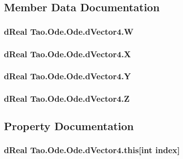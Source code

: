 \subsection{Member Data Documentation}
\hypertarget{struct_tao_1_1_ode_1_1_ode_1_1d_vector4_a473e7cd9bea8d218b3974ab6435f60e7}{
\subsubsection[{W}]{\setlength{\rightskip}{0pt plus 5cm}dReal {\bf Tao.Ode.Ode.dVector4.W}}}
\label{struct_tao_1_1_ode_1_1_ode_1_1d_vector4_a473e7cd9bea8d218b3974ab6435f60e7}
\hypertarget{struct_tao_1_1_ode_1_1_ode_1_1d_vector4_aaf49131f71e1646a0daead1f177e31e3}{
\subsubsection[{X}]{\setlength{\rightskip}{0pt plus 5cm}dReal {\bf Tao.Ode.Ode.dVector4.X}}}
\label{struct_tao_1_1_ode_1_1_ode_1_1d_vector4_aaf49131f71e1646a0daead1f177e31e3}
\hypertarget{struct_tao_1_1_ode_1_1_ode_1_1d_vector4_acb788d66c1d18be2e7d912729c9ebfd9}{
\subsubsection[{Y}]{\setlength{\rightskip}{0pt plus 5cm}dReal {\bf Tao.Ode.Ode.dVector4.Y}}}
\label{struct_tao_1_1_ode_1_1_ode_1_1d_vector4_acb788d66c1d18be2e7d912729c9ebfd9}
\hypertarget{struct_tao_1_1_ode_1_1_ode_1_1d_vector4_af591a8cc6be6f3b2d15a304e99285b12}{
\subsubsection[{Z}]{\setlength{\rightskip}{0pt plus 5cm}dReal {\bf Tao.Ode.Ode.dVector4.Z}}}
\label{struct_tao_1_1_ode_1_1_ode_1_1d_vector4_af591a8cc6be6f3b2d15a304e99285b12}


\subsection{Property Documentation}
\hypertarget{struct_tao_1_1_ode_1_1_ode_1_1d_vector4_a7d9b55ac2b24b6f5c23738cd8dc85a7d}{
\subsubsection[{this}]{\setlength{\rightskip}{0pt plus 5cm}dReal Tao.Ode.Ode.dVector4.this\mbox{[}int index\mbox{]}}}
\label{struct_tao_1_1_ode_1_1_ode_1_1d_vector4_a7d9b55ac2b24b6f5c23738cd8dc85a7d}


